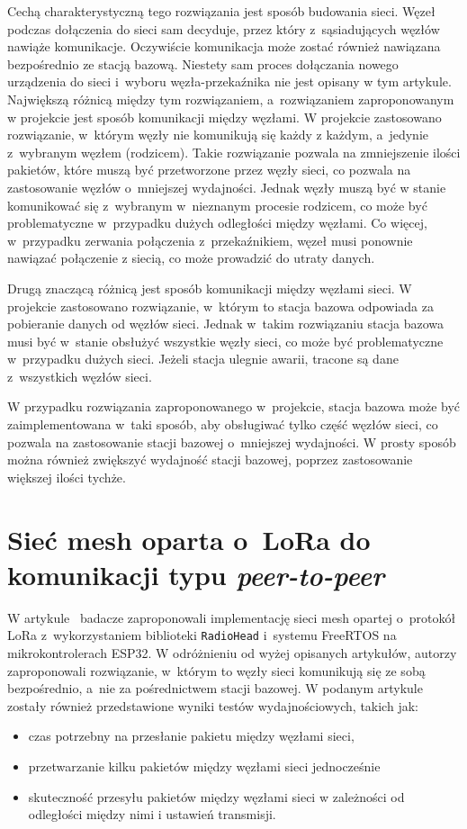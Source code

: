 Cechą charakterystyczną tego rozwiązania jest sposób budowania sieci.
Węzeł podczas dołączenia do sieci sam decyduje, przez który z~sąsiadujących węzłów nawiąże komunikacje.
Oczywiście komunikacja może zostać również nawiązana bezpośrednio ze stacją bazową.
Niestety sam proces dołączania nowego urządzenia do sieci i~wyboru węzła-przekaźnika nie jest opisany w tym artykule.
Największą różnicą między tym rozwiązaniem, a~rozwiązaniem zaproponowanym w projekcie jest sposób komunikacji między węzłami.
W projekcie zastosowano rozwiązanie, w~którym węzły nie komunikują się każdy z każdym, a~jedynie z~wybranym węzłem (rodzicem).
Takie rozwiązanie pozwala na zmniejszenie ilości pakietów, które muszą być przetworzone przez węzły sieci, co pozwala na zastosowanie węzłów o~mniejszej wydajności.
Jednak węzły muszą być w stanie komunikować się z~wybranym w~nieznanym procesie rodzicem, co może być problematyczne w~przypadku dużych odległości między węzłami.
Co więcej, w~przypadku zerwania połączenia z~przekaźnikiem, węzeł musi ponownie nawiązać połączenie z siecią, co może prowadzić do utraty danych.

Drugą znaczącą różnicą jest sposób komunikacji między węzłami sieci.
W projekcie zastosowano rozwiązanie, w~którym to stacja bazowa odpowiada za pobieranie danych od węzłów sieci.
Jednak w~takim rozwiązaniu stacja bazowa musi być w~stanie obsłużyć wszystkie węzły sieci, co może być problematyczne w~przypadku dużych sieci.
Jeżeli stacja ulegnie awarii, tracone są dane z~wszystkich węzłów sieci.

W przypadku rozwiązania zaproponowanego w~projekcie, stacja bazowa może być zaimplementowana w~taki sposób, aby obsługiwać tylko część węzłów sieci, co pozwala na zastosowanie stacji bazowej o~mniejszej wydajności.
W prosty sposób można również zwiększyć wydajność stacji bazowej, poprzez zastosowanie większej ilości tychże.

\section{Sieć mesh oparta o~LoRa do komunikacji typu \emph{peer-to-peer}}
W artykule~\cite{s21134314} badacze zaproponowali implementację sieci mesh opartej o~protokół LoRa z~wykorzystaniem biblioteki \texttt{RadioHead} i~systemu FreeRTOS na mikrokontrolerach ESP32.
W odróżnieniu od wyżej opisanych artykułów, autorzy zaproponowali rozwiązanie, w~którym to węzły sieci komunikują się ze sobą bezpośrednio, a~nie za pośrednictwem stacji bazowej.
W podanym artykule zostały również przedstawione wyniki testów wydajnościowych, takich jak:
\begin{itemize}
    \item czas potrzebny na przesłanie pakietu między węzłami sieci,
    \item przetwarzanie kilku pakietów między węzłami sieci jednocześnie
    \item skuteczność przesyłu pakietów między węzłami sieci w zależności od odległości między nimi i ustawień transmisji.
\end{itemize}

